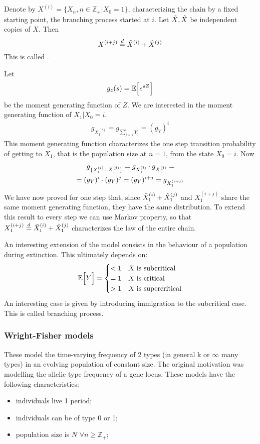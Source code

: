 \documentclass{article}
\begin{document}
	\begin{proposition}{}
		Denote by $X^{(i)}=\{{X_n}, n \in \mathbb{Z}_+|X_0=1\}$, characterizing the chain by a fixed starting point, the branching process started at $i$. Let $\Tilde{X},\hat{X}$ be independent copies of $X$. Then
		\begin{equation}
			X^{(i+j)}\stackrel{d}{=}\Tilde{X}^{(i)}+\hat{X}^{(j)}
		\end{equation}
		This is called .
	\end{proposition}
	\begin{proof2}
		Let 
		\[
		g_{z}(s)=\mathbb{E}\Bigl[{e^{sZ}}\Bigr]
		\]
		be the moment generating function of $Z$. We are interested in the moment generating function of $X_1|X_0=i$.
		\begin{align*}
			g_{X_1^{(i)}}=g_{\sum_{j=1}^{i}Y_j} =(g_Y)^i
		\end{align*} 
		This moment generating function characterizes the one step transition probability of getting to $X_1$, that is the population size at $n=1$, from the state $X_0=i$. Now
		\begin{align*}
			&g_{\{\Tilde{X}_1^{(i)}+\hat{X}_1^{(j)}\}}=g_{\Tilde{X}_1^{(i)}}\cdot g_{\hat{X}_1^{(j)}}=\\
			=(&g_Y)^i\cdot(g_Y)^j=(g_Y)^{i+j}=g_{X_1^{(i+j)}}
		\end{align*}
		We have now proved for one step that, since $\Tilde{X}_1^{(i)}+\hat{X}_1^{(j)}$ and $X_1^{(i+j)}$ share the same moment generating function, they have the same distribution. To extend this result to every step we can use Markov property, so that $X^{(i+j)}_1\stackrel{d}{=}\Tilde{X}^{(i)}_1+\hat{X}^{(j)}_1$ characterizes the law of the entire chain.
	\end{proof2}
	An interesting extension of the model consists in the behaviour of a population during extinction. This ultimately depends on:
	\[
	\mathbb{E}\Bigl[{Y}\Bigr]=\begin{cases}
		<1 & X\; \text{is subcritical}\\
		=1 & X\; \text{is critical}\\
		>1 & X\; \text{is supercritical}\\
	\end{cases}
	\]
	An interesting case is given by introducing immigration to the subcritical case. This is called  branching process.
	\subsubsection*{Wright-Fisher models}
	These model the time-varying frequency of 2 types (in general k or $\infty$ many types) in an evolving population of constant size. The original motivation was modelling the allelic type frequency of a gene locus. These models have the following characteristics:
	\begin{itemize}
		\item individuals live 1 period;
		\item individuals can be of type 0 or 1;
		\item population size is $N$ $\forall n \geqslant \mathbb{Z}_+$;
	\end{itemize}
	
\end{document}
